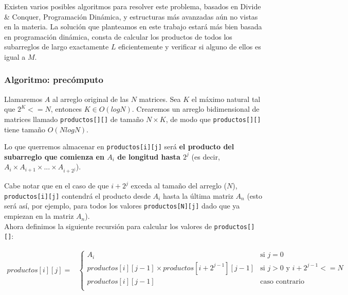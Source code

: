 Existen varios posibles algoritmos para resolver este problema, basados en Divide \& Conquer, 
Programación Dinámica, y estructuras más avanzadas aún no vistas en la materia. La solución que 
planteamos en este trabajo estará más bien basada en programación dinámica, consta de calcular 
los productos de 
todos los subarreglos de largo exactamente $L$ eficientemente y verificar si alguno de ellos 
es igual a $M$. \\

\subsubsection{Algoritmo: precómputo}

Llamaremos $A$ al arreglo original de las $N$ matrices. 
Sea $K$ el máximo natural tal que $2^K <= N$, entonces $K \in O(log N)$. Crearemos un arreglo 
bidimensional de matrices llamado \texttt{productos[][]} de tamaño $N \times K$, de modo que 
\texttt{productos[][]} tiene tamaño $O(N log N)$. 

Lo que querremos almacenar en \texttt{productos[i][j]} será \textbf{el producto del subarreglo que 
comienza en $A_i$ de longitud hasta $2^j$} (es decir, $A_i \times A_{i+1} \times ... \times A_{i+2^j}$). 

Cabe notar que en el caso de que $i+2^j$ exceda al tamaño del arreglo ($N$), 
\texttt{productos[i][j]} contendrá el producto desde $A_i$ hasta 
la última matriz $A_n$ (esto será así, por ejemplo, para todos los valores \texttt{productos[N][j]} dado 
que ya empiezan en la matriz $A_n$). \\

Ahora definimos la siguiente recursión para calcular los valores de \texttt{productos[][]}: 

\begin{align*}
productos[i][j] =
	&\begin{cases}
		A_i & \text{si $j=0$} \\
		productos[i][j-1] \times productos[i+2^{j-1}][j-1] & \text{si $j>0$ y $i+2^{j-1}<=N$} \\
		productos[i][j-1] & \text{caso contrario} \\
	\end{cases} \\
\end{align*}

